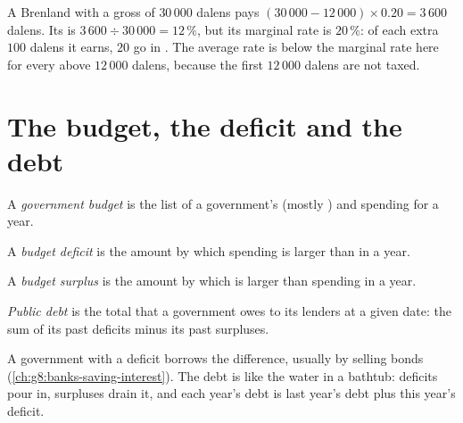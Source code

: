 A Brenland  with a gross  of $30\,000$ dalens pays $(30\,000 - 12\,000) \times 0.20 =
3\,600$ dalens. Its  is $3\,600 \div 30\,000 = 12\,\%$, but its marginal rate is
$20\,\%$: of each extra $100$ dalens it earns, $20$ go in . The average rate is below the marginal rate
here for every  above $12\,000$ dalens, because the first $12\,000$ dalens are not taxed.

\section{The budget, the deficit and the debt}

\begin{definition}\label{def:g8:taxes-and-public-spending:government-budget}
A \emph{government budget} is the list of a government's  (mostly
) and spending for a year.
\end{definition}

\begin{definition}\label{def:g8:taxes-and-public-spending:budget-deficit}
A \emph{budget deficit} is the amount by which spending is larger than 
in a year.
\end{definition}

\begin{definition}\label{def:g8:taxes-and-public-spending:budget-surplus}
A \emph{budget surplus} is the amount by which  is larger than spending
in a year.
\end{definition}

\begin{definition}\label{def:g8:taxes-and-public-spending:public-debt}
\emph{Public debt} is the total that a government owes to its lenders at a given
date: the sum of its past deficits minus its past surpluses.
\end{definition}

A government with a deficit borrows the difference, usually by selling bonds
(\cref{ch:g8:banks-saving-interest}). The debt is like the water in a bathtub: deficits pour in,
surpluses drain it, and each year's debt is last year's debt plus this year's deficit.

